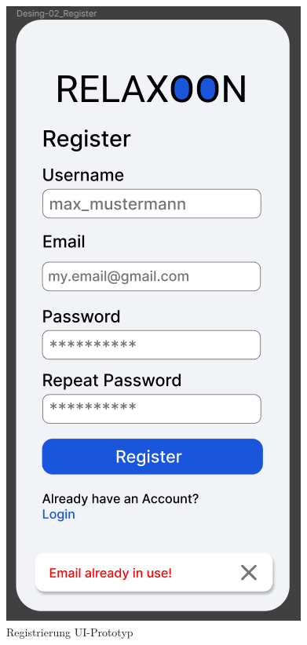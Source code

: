 \begin{figure}[H]
    \begin{minipage}{0.5\textwidth}
        \centering
        \includegraphics[height=2\textwidth]{./pics/pRegister.png}
        \caption{Registrierung UI-Prototyp}

\end{minipage}
\end{figure}
